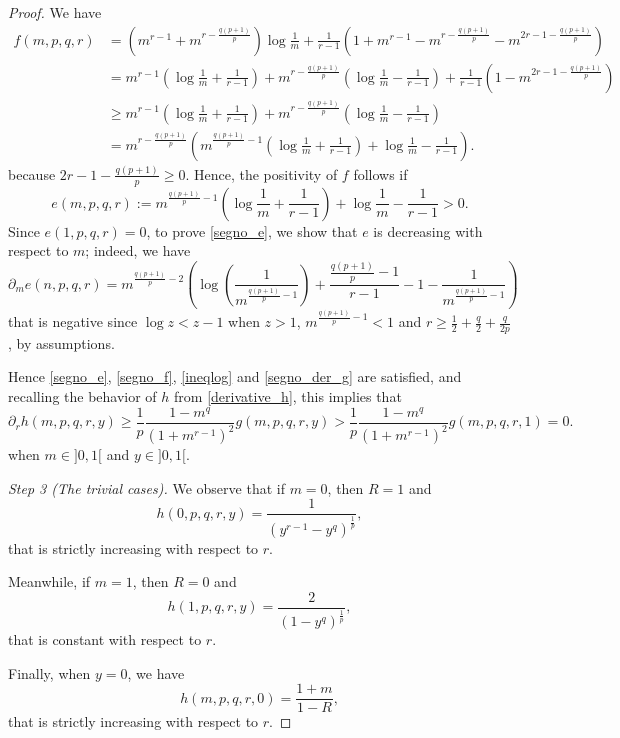 \documentclass[10pt,a4paper]{amsart}
\newcommand{\de}{\partial}
\begin{document}
\begin{proof}
We have
\begin{equation*}
\begin{split}
f(m,p,q,r)&=\left(m^{r-1}+m^{r-\frac{q(p+1)}p}\right)\log\frac{1}{m} +\frac1{r-1} \left( 1+m^{r-1}-m^{r-\frac{q(p+1)}p}-m^{2r-1-\frac{q(p+1)}p}\right)\\
&= m^{r-1}\left(\log\frac 1m+\frac1{r-1} \right)+ m^{r-\frac{q(p+1)}p}\left(\log\frac1m-\frac1{r-1} \right)+\frac1{r-1} \left(1-m^{2r-1-\frac{q(p+1)}p}\right)\\
&\ge m^{r-1}\left(\log\frac 1m+\frac1{r-1}\right)+ m^{r-\frac{q(p+1)}p}\left(\log\frac1m-\frac1{r-1}\right)\\
&=m^{r-\frac{q(p+1)}p}\left(m^{\frac{q(p+1)}p-1}\left(\log\frac 1m+\frac1{r-1}\right)+\log\frac 1m-\frac1{r-1}\right).
\end{split}
\end{equation*}
because $2r-1-\frac{q(p+1)}p\ge0$.
Hence, the positivity of $f$ follows if
\begin{equation}
\label{segno_e}
e(m,p,q,r):=m^{\frac{q(p+1)}p-1}\left(\log\frac 1m+\frac1{r-1}\right)+\log\frac 1m-\frac1{r-1}>0.
\end{equation}
Since $e(1,p,q,r)=0$, to prove \eqref{segno_e}, we show that $e$ is decreasing with respect to $m$; indeed, we have
\[
\partial_m e (n,p,q,r)=m^{\frac{q(p+1)}p-2}\left(\log\left( \frac 1{m^{\frac{q(p+1)}p-1}} \right)+\frac {\frac{q(p+1)}p-1}{r-1} -1-\frac1{m^{\frac{q(p+1)}p-1}} \right)
\]
that is negative since $\log z < z-1$ when $z>1$, $m^{\frac{q(p+1)}p-1}<1$ and $r\ge\frac 12+\frac q2 +\frac q{2p}$, by assumptions.

Hence \eqref{segno_e}, \eqref{segno_f}, \eqref{ineqlog} and \eqref{segno_der_g} are satisfied, and recalling the behavior of $h$ from \eqref{derivative_h}, this implies that
\[
\de_{r}h (m,p,q,r,y)\ge \frac1p\frac{1-m^{q}}{(1+m^{r-1})^{2}} g(m,p,q,r,y)> \frac1p\frac{1-m^{q}}{(1+m^{r-1})^{2}} 
g(m,p,q,r,1)=0.
\]
when $m\in]0,1[$ and $y\in]0,1[$.
%
%
%

\textit{Step 3 (The trivial cases).} We observe that if $m=0$, then $R=1$ and 
\[h(0,p,q,r,y)=\frac{1}{ (y^{r-1}- y^q)^\frac 1 p},
\]
that is strictly increasing with respect to $r$.

Meanwhile, if $m=1$, then $R=0$ and
\[
h(1,p,q,r,y)=\frac{2}{ (1- y^q)^\frac 1 p}, 
\]
that is constant with respect to $r$. 

Finally, when $y=0$, we have
\[
h(m,p,q,r,0)=\frac{1+m}{1-R},
\]
that is strictly increasing with respect to $r$.
\end{proof}
\end{document}
